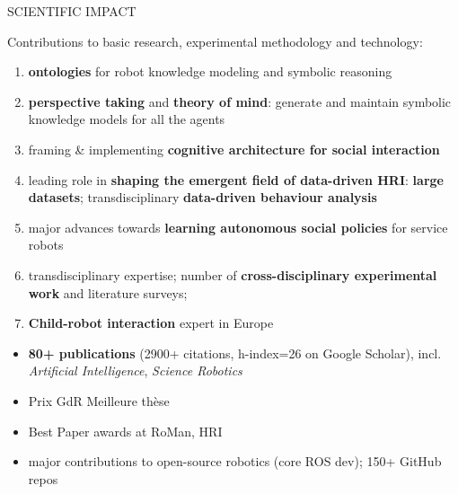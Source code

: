\documentclass[xcolor=table]{beamer}
\begin{document}
\begin{frame}{SCIENTIFIC IMPACT}

    Contributions to basic research, experimental methodology and technology:

    {\scriptsize
    \begin{enumerate}
        \item \textbf{ontologies} for robot knowledge modeling and symbolic
            reasoning
        \item \textbf{perspective taking} and \textbf{theory of mind}: generate and
            maintain symbolic knowledge models for all the agents
        \item framing \& implementing \textbf{cognitive architecture for social interaction}
        \item leading role in \textbf{shaping the emergent field of data-driven
            HRI}: \textbf{large datasets}; transdisciplinary \textbf{data-driven behaviour analysis} 
        \item major advances towards \textbf{learning autonomous social policies} for service robots
        \item transdisciplinary expertise; number of \textbf{cross-disciplinary
            experimental work} and literature surveys;
        \item \textbf{Child-robot interaction} expert in Europe
    \end{enumerate}
    }

    {\scriptsize
    \begin{itemize}
        \item \textbf{80+ publications} (2900+ citations, h-index=26 on Google Scholar), incl. \emph{Artificial Intelligence},
            \emph{Science Robotics}
        \item Prix GdR Meilleure thèse
        \item Best Paper awards at RoMan, HRI
        \item major contributions to open-source robotics (core ROS dev); 150+ GitHub repos
    \end{itemize}
    }
\end{frame}
\end{document}
